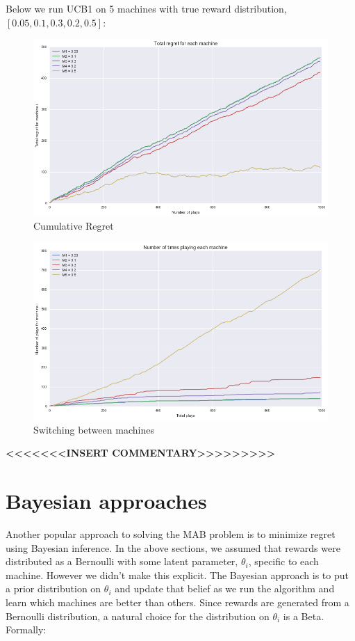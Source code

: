 \documentclass{article}
\begin{document}
Below we run UCB1 on 5 machines with true reward distribution, $[0.05,0.1,0.3,0.2,0.5]$:

\begin{figure}[H]
\centering
\includegraphics[scale=0.5]{UCB_regret.png}
\caption{Cumulative Regret}
\end{figure}


\begin{figure}[H]
\centering
\includegraphics[scale=0.5]{UCB_num_plays.png}
\caption{Switching between machines}
\end{figure}

\textbf{<<<<<<<INSERT COMMENTARY>>>>>>>>>}

\section{Bayesian approaches}

Another popular approach to solving the MAB problem is to minimize regret using Bayesian inference. In the above sections, we assumed that rewards were distributed as a Bernoulli with some latent parameter, $\theta_i$, specific to each machine. However we didn't make this explicit. The Bayesian approach is to put a prior distribution on $\theta_i$ and update that belief as we run the algorithm and learn which machines are better than others. Since rewards are generated from a Bernoulli distribution, a natural choice for the distribution on $\theta_i$ is a Beta. Formally:
\end{document}

